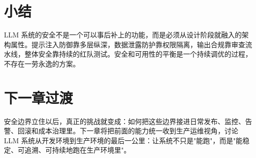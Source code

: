 \section{小结}
LLM 系统的安全不是一个可以事后补上的功能，而是必须从设计阶段就融入的架构属性。提示注入防御靠多层纵深，数据泄露防护靠权限隔离，输出合规靠审查流水线，整体安全靠持续的红队测试。安全和可用性的平衡是一个持续调优的过程，不存在一劳永逸的方案。

\section{下一章过渡}
安全边界立住以后，真正的挑战就变成：如何把这些边界接进日常发布、监控、告警、回滚和成本治理里。下一章将把前面的能力统一收到生产运维视角，讨论 LLM 系统从开发环境到生产环境的最后一公里：让系统不只是"能跑"，而是"能稳定、可追溯、可持续地跑在生产环境里"。
